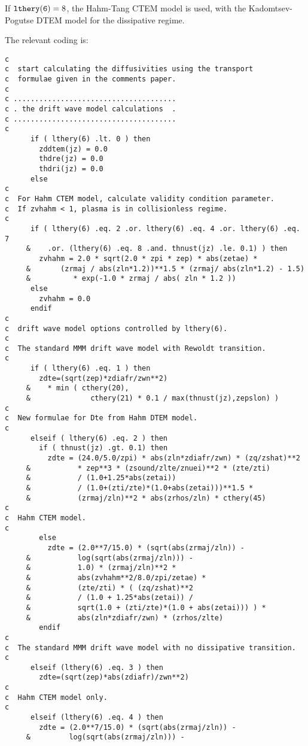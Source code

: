 If $ {\tt lthery(6)} = 8 $, the Hahm-Tang CTEM model is used, with the 
Kadomtsev-Pogutse DTEM model for the dissipative regime.

The relevant coding is:

\begin{verbatim}
c
c  start calculating the diffusivities using the transport
c  formulae given in the comments paper.
c
c ......................................
c . the drift wave model calculations  .
c ......................................
c
      if ( lthery(6) .lt. 0 ) then
        zddtem(jz) = 0.0
        thdre(jz) = 0.0
        thdri(jz) = 0.0
      else
c
c  For Hahm CTEM model, calculate validity condition parameter.
c  If zvhahm < 1, plasma is in collisionless regime.
c
      if ( lthery(6) .eq. 2 .or. lthery(6) .eq. 4 .or. lthery(6) .eq. 7
     &    .or. (lthery(6) .eq. 8 .and. thnust(jz) .le. 0.1) ) then
        zvhahm = 2.0 * sqrt(2.0 * zpi * zep) * abs(zetae) *
     &       (zrmaj / abs(zln*1.2))**1.5 * (zrmaj/ abs(zln*1.2) - 1.5)
     &          * exp(-1.0 * zrmaj / abs( zln * 1.2 ))
      else
        zvhahm = 0.0
      endif
c
c  drift wave model options controlled by lthery(6).
c
c  The standard MMM drift wave model with Rewoldt transition.
c
      if ( lthery(6) .eq. 1 ) then
        zdte=(sqrt(zep)*zdiafr/zwn**2)
     &    * min ( cthery(20),
     &              cthery(21) * 0.1 / max(thnust(jz),zepslon) )
c
c  New formulae for Dte from Hahm DTEM model.
c
      elseif ( lthery(6) .eq. 2 ) then
        if ( thnust(jz) .gt. 0.1) then
          zdte = (24.0/5.0/zpi) * abs(zln*zdiafr/zwn) * (zq/zshat)**2
     &           * zep**3 * (zsound/zlte/znuei)**2 * (zte/zti) 
     &           / (1.0+1.25*abs(zetai))
     &           / (1.0+(zti/zte)*(1.0+abs(zetai)))**1.5 *
     &           (zrmaj/zln)**2 * abs(zrhos/zln) * cthery(45)
c
c  Hahm CTEM model.
c
        else
          zdte = (2.0**7/15.0) * (sqrt(abs(zrmaj/zln)) -
     &           log(sqrt(abs(zrmaj/zln))) -
     &           1.0) * (zrmaj/zln)**2 *
     &           abs(zvhahm**2/8.0/zpi/zetae) *
     &           (zte/zti) * ( (zq/zshat)**2
     &           / (1.0 + 1.25*abs(zetai)) /
     &           sqrt(1.0 + (zti/zte)*(1.0 + abs(zetai))) ) *
     &           abs(zln*zdiafr/zwn) * (zrhos/zlte)
        endif
c
c  The standard MMM drift wave model with no dissipative transition.
c
      elseif (lthery(6) .eq. 3 ) then
        zdte=(sqrt(zep)*abs(zdiafr)/zwn**2)
c
c  Hahm CTEM model only.
c
      elseif (lthery(6) .eq. 4 ) then
        zdte = (2.0**7/15.0) * (sqrt(abs(zrmaj/zln)) -
     &         log(sqrt(abs(zrmaj/zln))) -

\end{verbatim}
